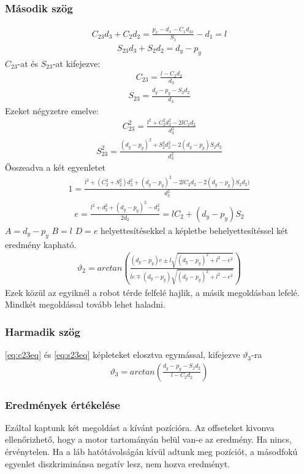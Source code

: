 \documentclass{article}
\begin{document}
\subsubsection{Második szög}
\begin{align*}
C_{23} d_3+C_2 d_2=\frac{p_x-d_x-C_1 d_{3x}}{S_1} -d_1=l
\end{align*}
\begin{align*}
S_{23} d_3+S_2 d_2=d_y-p_y
\end{align*}
$C_{23}$-at és $S_{23}$-at kifejezve:
\begin{align}\label{eq:c23eq}
C_{23}=\frac{l-C_2 d_2}{d_3}
\end{align}
\begin{align}\label{eq:s23eq}
S_{23}=\frac{d_y-p_y-S_2 d_2}{d_3} 
\end{align}
Ezeket négyzetre emelve:
\begin{align*}
C_{23}^2=\frac{l^2+C_2^2 d_2^2-2lC_2 d_2}{d_3^2}
\end{align*}
\begin{align*}
S_{23}^2=\frac{\left(d_y-p_y\right)^2+S_2^2d_2^2-2\left(d_y-p_y\right)S_2d_2}{d_3^2}
\end{align*}
Összeadva a két egyenletet
\begin{align*}
1=\frac{l^2+(C_2^2+S_2^2)d_2^2+\left(d_y-p_y\right)^2-2lC_2 d_2-2\left(d_y-p_y\right)S_2 d_2)}{d_3^2}
\end{align*}
\begin{align*}
e=\frac{l^2+d_2^2+\left(d_y-p_y\right)^2-d_3^2}{2d_2}=lC_2+\left(d_y-p_y\right)S_2
\end{align*}
$A=d_y-p_y$ $B=l$ $D=e$ helyettesítésekkel a képletbe behelyettesítéssel két eredmény kapható.
\begin{align}
\vartheta_2 = arctan \left( \frac{(d_y-p_y) e\pm l\sqrt{(d_y-p_y)^2+l^2-e^2}}{l e\mp (d_y-p_y)\sqrt{(d_y-p_y)^2+l^2-e^2}} \right)
\end{align}
Ezek közül az egyiknél a robot térde felfelé hajlik, a másik megoldásban lefelé. Mindkét megoldással tovább lehet haladni.
\subsubsection{Harmadik szög}
\eqref{eq:c23eq} és \eqref{eq:s23eq} képleteket elosztva egymással, kifejezve $\vartheta_3$-ra
\begin{align}
\vartheta_3=arctan\left(\frac{d_y-p_y-S_2 d_2}{l-C_2 d_2}\right)
\end{align}
\subsubsection{Eredmények értékelése}
Ezáltal kaptunk két megoldást a kívánt pozícióra. Az offseteket kivonva ellenőrizhető, hogy a motor tartományán belül van-e az eredmény. Ha nincs, érvénytelen. Ha a láb hatótávolságán kívül adtunk meg pozíciót, a másodfokú egyenlet diszkriminánsa negatív lesz, nem hozva eredményt.
\end{document}
